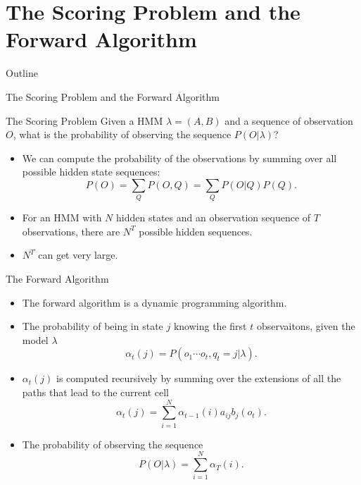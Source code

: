 \documentclass{beamer}
\begin{document}
\section{The Scoring Problem and the Forward Algorithm}
\begin{frame}{Outline}
	\tableofcontents[currentsection]
\end{frame}
\begin{frame}{The Scoring Problem and the Forward Algorithm}
	\begin{block}{The Scoring Problem}
		Given a HMM $\lambda = (A,B)$ and a sequence of observation $O$, what is the probability of observing the sequence $P(O \vert \lambda)$?
	\end{block}
	\begin{itemize}
		\item We can compute the probability of the observations by summing over all possible hidden state sequences:
		$$P(O) = \sum_Q P(O, Q) = \sum_Q P(O\vert Q) P(Q).$$
		\item For an HMM with $N$ hidden states and an observation sequence of $T$ observations, there are $N^T$ possible hidden sequences.
		\item $N^T$ can get very large.
	\end{itemize}
\end{frame}

\begin{frame}{The Forward Algorithm}
	\begin{itemize}
		\item The forward algorithm is a dynamic programming algorithm. 
		\item The probability of being in state $j$ knowing the first $t$ observaitons, given the model $\lambda$
		\begin{equation}
			\alpha_t(j) = P(o_1\cdots o_t, q_t = j \vert \lambda).
		\end{equation}
		\item $\alpha_t(j)$ is computed recursively by summing over the extensions of all the paths that lead to the current cell
		\begin{equation}
			\alpha_t(j) = \sum_{i=1}^N \alpha_{t-1}(i) a_{ij} b_j (o_t).
		\end{equation}
		\item The probability of observing the sequence
		\begin{equation}
			P(O \vert \lambda) = \sum_{i=1}^N \alpha_T(i).
		\end{equation}
	\end{itemize}
\end{frame}
\end{document}
